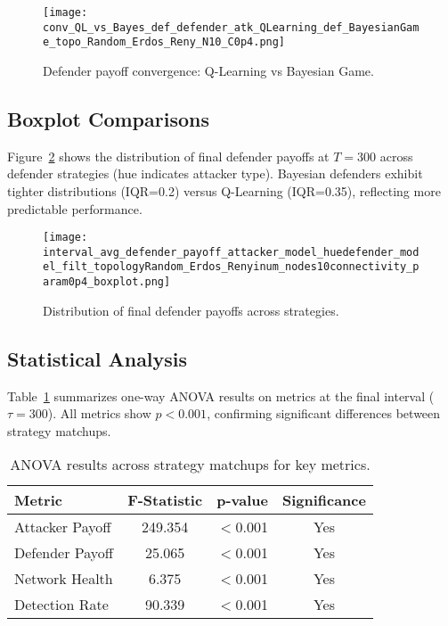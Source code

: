 \documentclass[conference]{IEEEtran}
\begin{document}
\begin{figure}[htbp]
  \centering
  \texttt{[image: conv\_QL\_vs\_Bayes\_def\_defender\_atk\_QLearning\_def\_BayesianGame\_topo\_Random\_Erdos\_Reny\_N10\_C0p4.png]}
  \caption{Defender payoff convergence: Q-Learning vs Bayesian Game.}
  \label{fig:conv_db}
\end{figure}

\subsection{Boxplot Comparisons}
Figure~\ref{fig:def_box} shows the distribution of final defender payoffs at $T=300$ across defender strategies (hue indicates attacker type). Bayesian defenders exhibit tighter distributions (IQR=0.2) versus Q-Learning (IQR=0.35), reflecting more predictable performance.

\begin{figure}[htbp]
  \centering
  \texttt{[image: interval\_avg\_defender\_payoff\_attacker\_model\_huedefender\_model\_filt\_topologyRandom\_Erdos\_Renyinum\_nodes10connectivity\_param0p4\_boxplot.png]}
  \caption{Distribution of final defender payoffs across strategies.}
  \label{fig:def_box}
\end{figure}

\subsection{Statistical Analysis}
Table~\ref{tab:anova} summarizes one-way ANOVA results on metrics at the final interval ($\tau=300$). All metrics show $p<0.001$, confirming significant differences between strategy matchups.

\begin{table}[htbp]
  \centering
  \begin{tabular}{lccc}
    \toprule
    \textbf{Metric} & \textbf{F-Statistic} & \textbf{p-value} & \textbf{Significance} \\
    \midrule
    Attacker Payoff & 249.354 & $<$0.001 & Yes \\
    Defender Payoff & 25.065 & $<$0.001 & Yes \\
    Network Health   & 6.375  & $<$0.001 & Yes \\
    Detection Rate   & 90.339 & $<$0.001 & Yes \\
    \bottomrule
  \end{tabular}
  \caption{ANOVA results across strategy matchups for key metrics.}
  \label{tab:anova}
\end{table}
\end{document}
